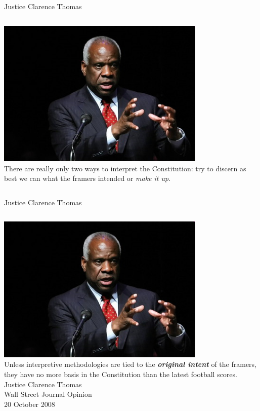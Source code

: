 \begin{frame}{Justice Clarence Thomas}
    \begin{columns}[onlytextwidth]
            \centering
            \includegraphics[width=0.75\textwidth]{img/clarence-thomas.png} \\
            There are really only two ways to interpret the Constitution: try to discern as best we can what the framers intended or \emph{make it up}.
    \end{columns}
\end{frame}

\begin{frame}{Justice Clarence Thomas}
    \begin{columns}[onlytextwidth]
            \centering
            \includegraphics[width=0.75\textwidth]{img/clarence-thomas.png} \\
        Unless interpretive methodologies are tied to the
        \textbf{\emph{original intent}} of the framers, they have no more basis
        in the Constitution than the latest football scores. \\
        \vspace{10pt}
        Justice Clarence Thomas \\ Wall Street Journal Opinion \\ 20 October 2008
    \end{columns}
\end{frame}

